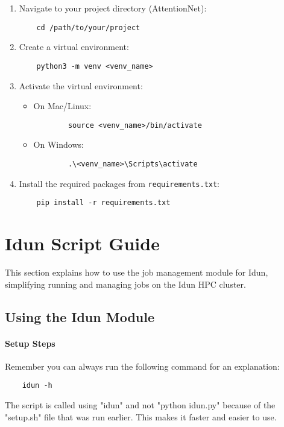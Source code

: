 \begin{enumerate}
    \item Navigate to your project directory (AttentionNet):
    \begin{verbatim}
    cd /path/to/your/project
    \end{verbatim}

    \item Create a virtual environment:
    \begin{verbatim}
    python3 -m venv <venv_name>
    \end{verbatim}

    \item Activate the virtual environment:
    \begin{itemize}
        \item On Mac/Linux:
        \begin{verbatim}
        source <venv_name>/bin/activate
        \end{verbatim}

        \item On Windows:
        \begin{verbatim}
        .\<venv_name>\Scripts\activate
        \end{verbatim}
    \end{itemize}

    \item Install the required packages from \texttt{requirements.txt}:
    \begin{verbatim}
    pip install -r requirements.txt
    \end{verbatim}
\end{enumerate}


\section{Idun Script Guide}

This section explains how to use the job management module for Idun, simplifying running and managing jobs on the Idun HPC cluster.

\subsection{Using the Idun Module}

\paragraph{Setup Steps}
Remember you can always run the following command for an explanation:
\begin{verbatim}
    idun -h
\end{verbatim}
The script is called using "idun" and not "python idun.py" because of the "setup.sh" file that was run earlier. This makes it faster and easier to use.

